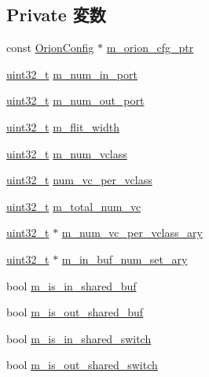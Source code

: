 \subsection*{Private 変数}
\begin{DoxyCompactItemize}
\item 
const \hyperlink{classOrionConfig}{OrionConfig} $\ast$ \hyperlink{classOrionRouter_a84de60ae1f7ca812df5347e27a658c77}{m\_\-orion\_\-cfg\_\-ptr}
\item 
\hyperlink{Type_8hh_a435d1572bf3f880d55459d9805097f62}{uint32\_\-t} \hyperlink{classOrionRouter_aac6d2a4ff86073212e8ef4ac53742ddc}{m\_\-num\_\-in\_\-port}
\item 
\hyperlink{Type_8hh_a435d1572bf3f880d55459d9805097f62}{uint32\_\-t} \hyperlink{classOrionRouter_a56cb909217f28866d2a08a40adb3ef08}{m\_\-num\_\-out\_\-port}
\item 
\hyperlink{Type_8hh_a435d1572bf3f880d55459d9805097f62}{uint32\_\-t} \hyperlink{classOrionRouter_a5c6cdf07d59103637f21c8a460ba7e2e}{m\_\-flit\_\-width}
\item 
\hyperlink{Type_8hh_a435d1572bf3f880d55459d9805097f62}{uint32\_\-t} \hyperlink{classOrionRouter_ac6cc31c075b331538b0aaa0bb593b2e3}{m\_\-num\_\-vclass}
\item 
\hyperlink{Type_8hh_a435d1572bf3f880d55459d9805097f62}{uint32\_\-t} \hyperlink{classOrionRouter_a00f9979941e10e772e291dae66cbe340}{num\_\-vc\_\-per\_\-vclass}
\item 
\hyperlink{Type_8hh_a435d1572bf3f880d55459d9805097f62}{uint32\_\-t} \hyperlink{classOrionRouter_a48a7cfde418b9966492bc3c9f4afec2d}{m\_\-total\_\-num\_\-vc}
\item 
\hyperlink{Type_8hh_a435d1572bf3f880d55459d9805097f62}{uint32\_\-t} $\ast$ \hyperlink{classOrionRouter_a7f42bc1b2c54b72c0409464a5781e74c}{m\_\-num\_\-vc\_\-per\_\-vclass\_\-ary}
\item 
\hyperlink{Type_8hh_a435d1572bf3f880d55459d9805097f62}{uint32\_\-t} $\ast$ \hyperlink{classOrionRouter_aa7fd06d6afc1b72df919702c1aa31b1c}{m\_\-in\_\-buf\_\-num\_\-set\_\-ary}
\item 
bool \hyperlink{classOrionRouter_a0d99d2417aa0de774e0dcc65595e424a}{m\_\-is\_\-in\_\-shared\_\-buf}
\item 
bool \hyperlink{classOrionRouter_a7323c9d46968f5cc55ce44889f68acd9}{m\_\-is\_\-out\_\-shared\_\-buf}
\item 
bool \hyperlink{classOrionRouter_a9fd4e7ce42d4a34ec79cdcc596ab8337}{m\_\-is\_\-in\_\-shared\_\-switch}
\item 
bool \hyperlink{classOrionRouter_a117999cd421d4f36ae63ed097adf937a}{m\_\-is\_\-out\_\-shared\_\-switch}

\end{DoxyCompactItemize}
